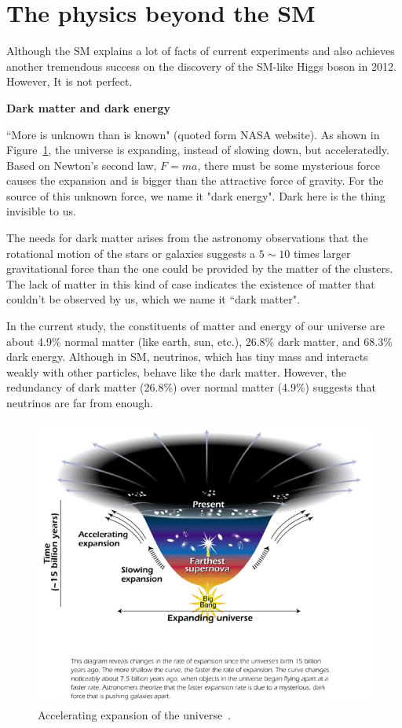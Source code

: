 \section{The physics beyond the SM}

Although the SM explains a lot of facts of current experiments and also achieves another tremendous success on 
the discovery of the SM-like Higgs boson in 2012. However, It is not perfect. 

{\bf Dark matter and dark energy}

``More is unknown than is known" (quoted form NASA website). 
As shown in Figure~\ref{fig:universe}, the universe is expanding, instead of slowing down,
but acceleratedly. 
Based on Newton's second law, $F = ma$, there must be some mysterious force 
causes the expansion and is bigger than the attractive force of gravity. 
For the source of this unknown force, we name it "dark energy". Dark here is 
the thing invisible to us. 

The needs for dark matter arises from the astronomy observations that the rotational motion of 
the stars or galaxies suggests a $5{\sim}10$ times larger gravitational force than the one could be provided 
by the matter of the clusters. The lack of matter in this kind of case indicates the existence of 
matter that couldn't be observed by us, which we name it ``dark matter".   
 
In the current study,  the constituents of matter and energy of our universe are about 4.9\% normal matter (like earth, sun, etc.), 26.8\% dark matter, and 68.3\% dark energy. Although in SM, neutrinos, which has tiny mass and interacts weakly with other particles, behave like 
the dark matter. However, the redundancy of dark matter (26.8\%) over normal matter (4.9\%) suggests that neutrinos are far from enough. 

\begin{figure}[htb]
\centering
\includegraphics[width=.7\textwidth]{figures/accelerating_universe.jpg}
\caption{Accelerating expansion of the universe~\cite{web:nasa}.}
\label{fig:universe}
\end{figure}  




